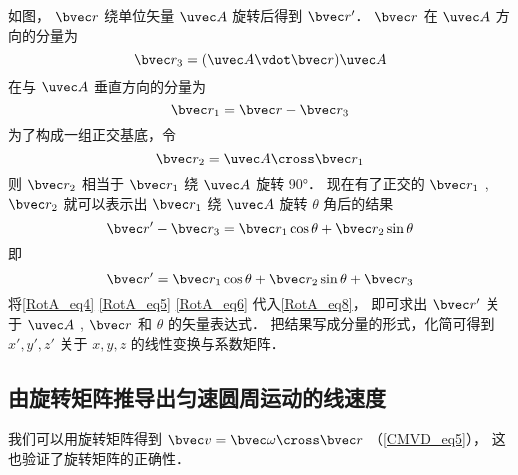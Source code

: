 如图， $\bvec r$ 绕单位矢量 $\uvec A$ 旋转后得到 $\bvec r'$．  $\bvec r$ 在 $\uvec A$ 方向的分量为   
\begin{equation}\label{RotA_eq4}
\bvec r_3 = (\uvec A \vdot \bvec r)\uvec A
\end{equation}
在与 $\uvec A$ 垂直方向的分量为
\begin{equation}\label{RotA_eq5}
\bvec r_1 = \bvec r - \bvec r_3
\end{equation}
为了构成一组正交基底，令
\begin{equation}\label{RotA_eq6}
\bvec r_2 = \uvec A \cross \bvec r_1
\end{equation}
则 $\bvec r_2$ 相当于 $\bvec r_1$ 绕 $\uvec A$ 旋转 90°． 现在有了正交的 $\bvec r_1$ , $\bvec r_2$  就可以表示出 $\bvec r_1$ 绕 $\uvec A$ 旋转 $\theta$ 角后的结果
\begin{equation}
\bvec r' - \bvec r_3 = \bvec r_1\cos \theta  + \bvec r_2\sin \theta
\end{equation}
即
\begin{equation}\label{RotA_eq8}
\bvec r' = \bvec r_1\cos \theta  + \bvec r_2\sin \theta  + \bvec r_3
\end{equation} 
将\autoref{RotA_eq4} \autoref{RotA_eq5} \autoref{RotA_eq6} 代入\autoref{RotA_eq8}， 即可求出 $\bvec r'$ 关于 $\uvec A$ , $\bvec r$ 和 $\theta $ 的矢量表达式． 把结果写成分量的形式，化简可得到 $x',y',z'$ 关于 $x,y,z$ 的线性变换与系数矩阵．

\subsection{由旋转矩阵推导出匀速圆周运动的线速度} 

我们可以用旋转矩阵得到 $\bvec v = \bvec \omega  \cross \bvec r$ （\autoref{CMVD_eq5}）， 这也验证了旋转矩阵的正确性．

